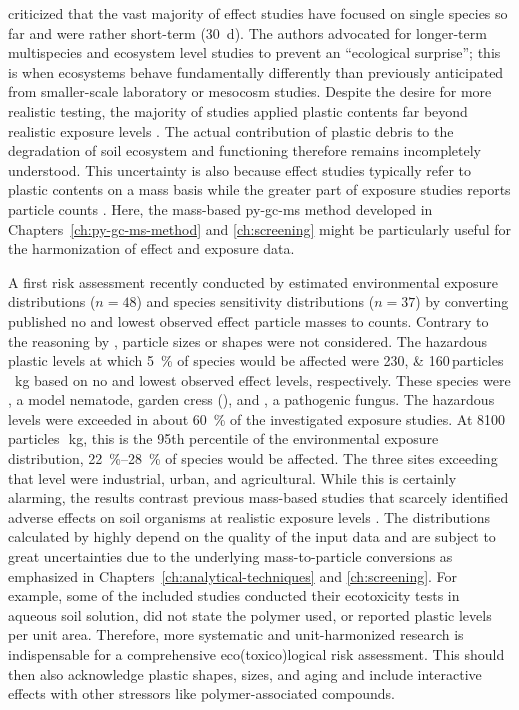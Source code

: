 \citet{BahoMicroplastics2021} criticized that the vast majority of effect studies have focused on single species so far and were rather short-term (\SI{30}{\day}). The authors advocated for longer-term multispecies and ecosystem level studies to prevent an ``ecological surprise''; this is when ecosystems behave fundamentally differently than previously anticipated from smaller-scale laboratory or mesocosm studies. Despite the desire for more realistic testing, the majority of studies applied plastic contents far beyond realistic exposure levels \citep{BuksWhat2020}. The actual contribution of plastic debris to the degradation of soil ecosystem and functioning therefore remains incompletely understood. This uncertainty is also because effect studies typically refer to plastic contents on a mass basis while the greater part of exposure studies reports particle counts \citep{LeuschConverting2021}. Here, the mass-based \ac{py-gc-ms} method developed in Chapters~\ref{ch:py-gc-ms-method} and \ref{ch:screening} might be particularly useful for the harmonization of effect and exposure data.

A first risk assessment recently conducted by \citet{JacquesProbabilistic2021} estimated environmental exposure distributions ($n = 48$) and species sensitivity distributions ($n = 37$) by converting published no and lowest observed effect particle masses to counts. Contrary to the reasoning by \citet{BuksWhat2020}, particle sizes or shapes were not considered. The hazardous plastic levels at which \SI{5}{\percent} of species would be affected were \numlist{230;160}\,particles\,\si{\per\kilo\gram} based on no and lowest observed effect levels, respectively. These species were , a model nematode, garden cress (), and , a pathogenic fungus. The hazardous levels were exceeded in about \SI{60}{\percent} of the investigated exposure studies. At \num{8100}\,particles\,\si{\per\kilo\gram}, this is the \num{95}th percentile of the environmental exposure distribution, \SIrange{22}{28}{\percent} of species would be affected. The three sites exceeding that level were industrial, urban, and agricultural.
While this is certainly alarming, the results contrast previous mass-based studies that scarcely identified adverse effects on soil organisms at realistic exposure levels \citep{BuksWhat2020}. The distributions calculated by \citet{JacquesProbabilistic2021} highly depend on the quality of the input data and are subject to great uncertainties due to the underlying mass-to-particle conversions as emphasized in Chapters~\ref{ch:analytical-techniques} and \ref{ch:screening}. For example, some of the included studies conducted their ecotoxicity tests in aqueous soil solution, did not state the polymer used, or reported plastic levels per unit area.
Therefore, more systematic and unit-harmonized research is indispensable for a comprehensive eco(toxico)logical risk assessment. This should then also acknowledge plastic shapes, sizes, and aging and include interactive effects with other stressors like polymer-associated compounds.

